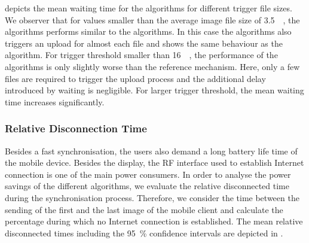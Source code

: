  depicts the mean waiting time \sojournTime for the \algosize algorithms for different trigger file sizes.
We observer that for values smaller than the average image file size of \SI{3.5}{\mega\byte}, the \algosize algorithms performs similar to the \algoimmediate algorithms.
In this case the \algosize algorithms also triggers an upload for almost each file and shows the same behaviour as the \algoimmediate algorithm.
For trigger threshold smaller than \SI{16}{\mega\byte}, the performance of the \algosize algorithms is only slightly worse than the reference mechanism.
Here, only a few files are required to trigger the upload process and the additional delay introduced by waiting is negligible.
For larger trigger threshold, the mean waiting time \sojournTime increases significantly.

\subsubsection*{Relative Disconnection Time}\label{sec:application:cloud_file_synchronisation:numerical_evaluation:relative_disconnection_time}

Besides a fast synchronisation, the users also demand a long battery life time of the mobile device.
Besides the display, the RF interface used to establish Internet connection is one of the main power consumers.
In order to analyse the power savings of the different algorithms, we evaluate the relative disconnected time  \relativeDisconnectedTime during the synchronisation process.
Therefore, we consider the time between the sending of the first and the last image of the mobile client and calculate the percentage during which no Internet connection is established.
The mean relative disconnected times including the \SI{95}{\percent} confidence intervals are depicted in . 

